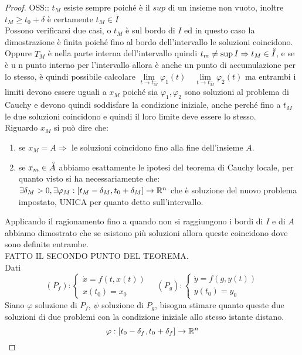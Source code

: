 \begin{proof}
	OSS:: $t_M$ esiste sempre poiché è il $sup$ di un insieme non vuoto, inoltre $t_M\ge t_0+\delta$ è certamente $t_M\in \overline{I}$\\
	Possono verificarsi due casi, o $t_M$ è sul bordo di $I$ ed in questo caso la dimostrazione è finita poiché fino al bordo dell'intervallo le soluzioni coincidono.
	Oppure $T_M$ è nella parte interna dell'intervallo quindi $t_m\ne\sup I\Rightarrow t_M\in\accentset{\circ}{I}$, e se è u n punto interno per l'intervallo allora è anche un punto di accumulazione per lo stesso, è quindi possibile calcolare $\lim\limits_{t\to t_M^{-}}\varphi_1(t)\quad\lim\limits_{t\to t_M^{-}}\varphi_2(t)$ ma entrambi i limiti devono essere uguali a $x_M$ poiché sia $\varphi_1,\varphi_2$ sono soluzioni al problema  di Cauchy e devono quindi soddisfare la condizione iniziale, anche perché fino a $t_M$ le due soluzioni coincidono e quindi il loro limite deve essere lo stesso.\\
	Riguardo $x_M$ si può dire che:
	\begin{enumerate}
		\item se $x_M = A\Rightarrow$ le soluzioni coincidono fino alla fine dell'insieme $A$.
		\item se $x_m\in\accentset{\circ}{A}$ abbiamo esattamente le ipotesi del teorema di Cauchy locale, per quanto visto si ha necessariamente che:\\
		$\exists \delta_M>0,\exists \varphi_M:\left[t_M-\delta_M,t_0+\delta_M\right]\to \mathbb{R}^n$ che è soluzione del nuovo problema impostato, UNICA per quanto detto sull'intervallo.
	\end{enumerate} 
	Applicando il ragionamento fino a quando non si raggiungono i bordi di $I$ e di $A$ abbiamo dimostrato che se esistono più soluzioni allora queste coincidono dove sono definite entrambe.\\
	FATTO IL SECONDO PUNTO DEL TEOREMA.\\
	Dati
	$$(P_f):\left\{\begin{matrix}\dot{x}=f(t,x(t))\\x(t_0)=x_{0}\end{matrix}\right.\quad	(P_g):\left\{\begin{matrix}\dot{y}=f(g,y(t))\\y(t_0)=y_{0}\end{matrix}\right.$$
	Siano $\varphi$ soluzione di $P_f$, $\psi$ soluzione di $P_g$, bisogna stimare quanto queste due soluzioni di due problemi con la condizione iniziale allo stesso istante distano.
	$$\varphi:\left[t_0-\delta_f,t_0+\delta_f\right]\to \mathbb{R}^n$$

\end{proof}
